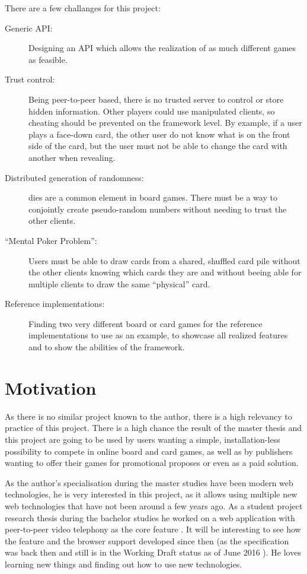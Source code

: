 There are a few challanges for this project:

\begin{description}
  \item[Generic \gls{API}:] Designing an \gls{API} which allows the realization
  of as much different games as feasible.
  \item[Trust control:] Being \gls{peer-to-peer} based, there is no trusted
  server to control or store \gls{hidden information}. Other players could use
  manipulated clients, so cheating should be prevented on the framework level.
  By example, if a user plays a \gls{face}-down card, the other user
  do not know what is on the front side of the card, but the user must not be
  able to change the card with another when revealing.
  \item[Distributed generation of randomness:] \Glspl{die} are a common element
  in board games. There must be a way to conjointly create pseudo-random numbers
  without needing to trust the other clients.
  \item[“Mental Poker Problem”:] Users must be able to draw cards from a
  shared, shuffled card pile without the other clients knowing which cards they
  are and without beeing able for multiple clients to draw the same “physical”
  card.
  \item[Reference implementations:] Finding two very different board or card
  games for the reference implementations to use as an example, to showcase all
  realized features and to show the abilities of the framework.
\end{description}

\section{Motivation}

As there is no similar project known to the author, there is a high relevancy to
practice of this project. There is a high chance the result of the master thesis
and this project are going to be used by users wanting a simple,
installation-less possibility to compete in online board and card games, as well
as by publishers wanting to offer their games for promotional proposes or even
as a paid solution.

As the author's specialisation during the master studies have been modern web
technologies, he is very interested in this project, as it allows using multiple
new web technologies that have not been around a few years ago. As a student
project research thesis during the bachelor studies he worked on a web
application with \gls{peer-to-peer} video telephony as the core feature
\cite{blaser2013practical}. It will be interesting to see how the feature and
the browser support developed since then (as the specification was back then and
still is in the Working Draft status as of June 2016 \cite{w3c2016webrtc}). He
loves learning new things and finding out how to use new technologies.

